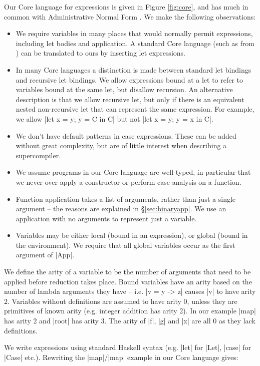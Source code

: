 \documentclass[draft]{sigplanconf}
\begin{document}
Our Core language for expressions is given in Figure \ref{fig:core}, and has much in common with Administrative Normal Form \cite{flanagan:continuations}. We make the following observations:

\begin{itemize}
\item We require variables in many places that would normally permit expressions, including let bodies and application. A standard Core language (such as from \citet{ghc_core}) can be translated to ours by inserting let expressions.
\item In many Core languages a distinction is made between standard let bindings and recursive let bindings. We allow expressions bound at a let to refer to variables bound at the same let, but disallow recursion. An alternative description is that we allow recursive let, but only if there is an equivalent nested non-recursive let that can represent the same expression. For example, we allow |let x = y; y = C in C| but not |let x = y; y = x in C|.
\item We don't have default patterns in case expressions. These can be added without great complexity, but are of little interest when describing a supercompiler.
\item We assume programs in our Core language are well-typed, in particular that we never over-apply a constructor or perform case analysis on a function.
\item Function application takes a list of arguments, rather than just a single argument -- the reasons are explained in \S\ref{sec:binaryapp}. We use an application with no arguments to represent just a variable.
\item Variables may be either local (bound in an expression), or global (bound in the environment). We require that all global variables occur as the first argument of |App|.
\end{itemize}

We define the arity of a variable to be the number of arguments that need to be applied before reduction takes place. Bound variables have an arity based on the number of lambda arguments they have -- i.e. |v = \x y -> z| causes |v| to have arity 2. Variables without definitions are assumed to have arity 0, unless they are primitives of known arity (e.g. integer addition has arity 2). In our example |map| has arity 2 and |root| has arity 3. The arity of |f|, |g| and |x| are all 0 as they lack definitions.

We write expressions using standard Haskell syntax (e.g. |let| for |Let|, |case| for |Case| etc.). Rewriting the |map|/|map| example in our Core language gives:
\end{document}
